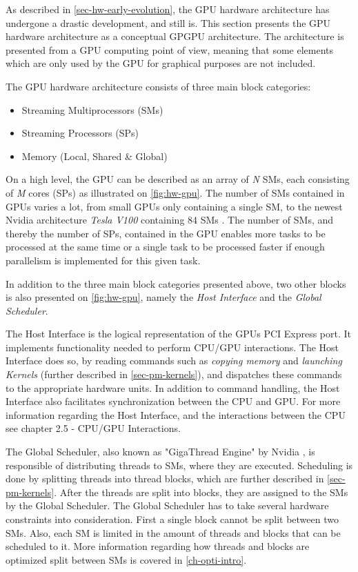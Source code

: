 As described in \cref{sec-hw-early-evolution}, the GPU hardware architecture has undergone a drastic development, and still is.
This section presents the GPU hardware architecture as a conceptual GPGPU architecture.
The architecture is presented from a GPU computing point of view, meaning that some elements which are only used by the GPU for graphical purposes are not included.

The GPU hardware architecture consists of three main block categories:
\begin{itemize}
	\item Streaming Multiprocessors (SMs)
	\item Streaming Processors (SPs) 
	\item Memory (Local, Shared \& Global)
\end{itemize}

On a high level, the GPU can be described as an array of \textit{N} SMs, each consisting of \textit{M} cores (SPs) as illustrated on \cref{fig:hw-gpu}. 
The number of SMs contained in GPUs varies a lot, from small GPUs only containing a single SM, to the newest Nvidia architecture \textit{Tesla V100} containing 84 SMs \cite{Nvidia2017}.
The number of SMs, and thereby the number of SPs, contained in the GPU enables more tasks to be processed at the same time or a single task to be processed faster if enough parallelism is implemented for this given task.


In addition to the three main block categories presented above, two other blocks is also presented on \cref{fig:hw-gpu}, namely the \textit{Host Interface} and the \textit{Global Scheduler}.

The Host Interface is the logical representation of the GPUs PCI Express port.
It implements functionality needed to perform CPU/GPU interactions. 
The Host Interface does so, by reading commands such as \textit{copying memory} and  \textit{launching Kernels} (further described in \cref{sec-pm-kernels}), and dispatches these commands to the appropriate hardware units.
In addition to command handling, the Host Interface also facilitates synchronization between the CPU and GPU. 
For more information regarding the Host Interface, and the interactions between the CPU see \cite{Wilt2013} chapter 2.5 - CPU/GPU Interactions.

The Global Scheduler, also known as "GigaThread Engine" by Nvidia \cite{Nvidia2009}, is responsible of distributing threads to SMs, where they are executed.
Scheduling is done by splitting threads into thread blocks, which are further described in \cref{sec-pm-kernels}.
After the threads are split into blocks, they are assigned to the SMs by the Global Scheduler.
The Global Scheduler has to take several hardware constraints into consideration.
First a single block cannot be split between two SMs.
Also, each SM is limited in the amount of threads and blocks that can be scheduled to it. 
More information regarding how threads and blocks are optimized split between SMs is covered in \cref{ch-opti-intro}.

